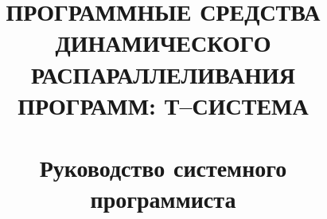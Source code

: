 \documentclass[a4paper,14pt]{uspd}
\title{ПРОГРАММНЫЕ СРЕДСТВА ДИНАМИЧЕСКОГО
РАСПАРАЛЛЕЛИВАНИЯ ПРОГРАММ: Т--СИСТЕМА \\
~\\
Руководство системного программиста}
\begin{document}
\sloppy


\end{document}
